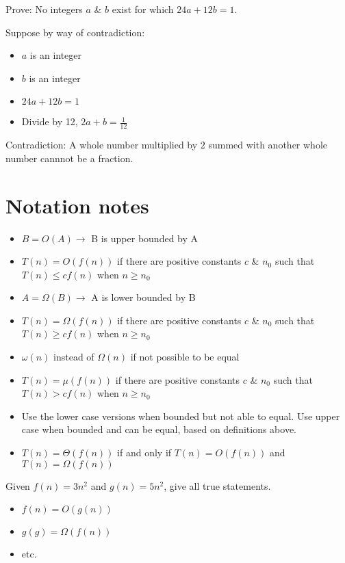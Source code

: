 \documentclass[12pt]{article}
\begin{document}
Prove: No integers $a$ \& $b$ exist for which $24a + 12b = 1$.

Suppose by way of contradiction:
\begin{itemize}
    \item $a$ is an integer
    \item $b$ is an integer
    \item $24a + 12b = 1$
    \item Divide by 12, $2a + b = \frac{1}{12}$
\end{itemize}

Contradiction: A whole number multiplied by $2$ summed with another whole number cannnot be a fraction.


\pagebreak

\section*{Notation notes}

\begin{itemize}
    \item $B = O(A) \rightarrow$ B is upper bounded by A
    \item $T(n) = O(f(n))$ if there are positive constants $c$ \& $n_0$ such that $T(n) \leq cf(n)$ when $n \geq n_0$
    \item $A = \Omega(B) \rightarrow$ A is lower bounded by B
    \item $T(n) = \Omega(f(n))$ if there are positive constants $c$ \& $n_0$ such that $T(n) \geq cf(n)$ when $n \geq n_0$
    \item $\omega(n)$ instead of $\Omega(n)$ if not possible to be equal
    \item $T(n) = \mu(f(n))$ if there are positive constants $c$ \& $n_0$ such that $T(n) > cf(n)$ when $n \geq n_0$
    \item Use the lower case versions when bounded but not able to equal. Use upper case when bounded and can be equal, based on definitions above.
    \item $T(n) = \Theta(f(n))$ if and only if $T(n) = O(f(n))$ and $T(n) = \Omega(f(n))$
\end{itemize}

Given $f(n) = 3n^2$ and $g(n) = 5n^2$, give all true statements.
\begin{itemize}
    \item $f(n) = O(g(n))$
    \item $g(g) = \Omega(f(n))$
    \item etc.
\end{itemize}
\end{document}
